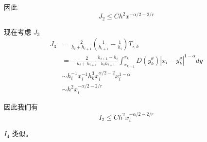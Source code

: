 \documentclass{ctexart}
\theoremstyle{definition}
\theoremstyle{remark}
\numberwithin{equation}{section}
\begin{document}
因此
\begin{equation}
    J_2 \le C h^2 x^{-\alpha/2-2/r}
\end{equation}

现在考虑 \(J_3\)
\begin{equation}
    \begin{aligned}
        J_3 & = \frac{2}{h_i + h_{i+1}}(\frac{1}{h_{i+1}} - \frac{1}{h_{i}}) T_{i,k}                                                            \\
            & = -\frac{2}{h_i + h_{i+1}}\frac{h_{i+1} -h_{i}}{h_{i}h_{i+1}} \int_{x_{k-1}}^{x_k} D(y_k^\theta) |x_i - y_k^\theta|^{1-\alpha} dy \\
            & \sim h_i^{-1}x_i^{-1} h_k^3 x_i^{\alpha/2-2} x_i^{1-\alpha}                                                                       \\
            & \sim h^2 x_i^{-\alpha/2-2/r}
    \end{aligned}
\end{equation}

因此我们有
\begin{equation}
    I_2 \le C h^2 x_i^{-\alpha/2-2/r}
\end{equation}

\(I_4\) 类似。

\newpage
\end{document}
